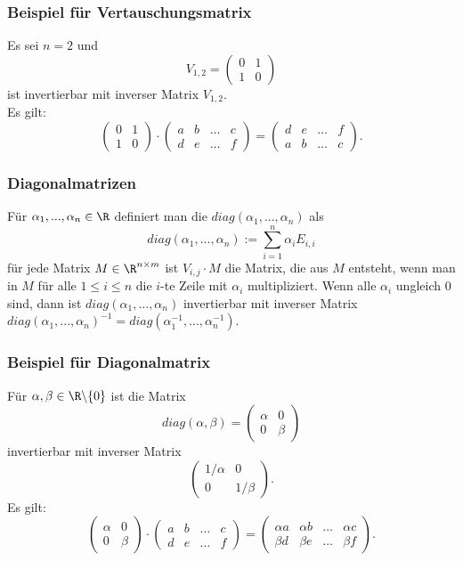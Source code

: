 \begin{frame}\frametitle{Beispiel für Vertauschungsmatrix}

	Es sei $n=2$ und 
	$$ 
		V_{1,2} =
		\begin{pmatrix}
			0 & 1\\
			1 & 0
		\end{pmatrix}
	$$
	ist invertierbar mit inverser Matrix $V_{1,2}$.\\
\pause \vfill
	Es gilt:
	$$
		\begin{pmatrix}
			0 & 1\\
			1 & 0
		\end{pmatrix} 
		\cdot
		\begin{pmatrix}
			a & b & \ldots & c\\
			d & e  & \ldots & f
		\end{pmatrix}
		=
		\begin{pmatrix}
			d & e  & \ldots & f\\
			a & b & \ldots & c
		\end{pmatrix}.
	$$
	
\end{frame}
%
\begin{frame}\frametitle{Diagonalmatrizen}
Für $\alpha_1,...,\alpha_n \in \R$ definiert man die  $diag(\alpha_1,...,\alpha_n)$ als
$$
diag(\alpha_1,...,\alpha_n):= \sum_{i=1}^n \alpha_i E_{i,i}
$$
für jede Matrix $M \in \R^{n\times m}$ ist $V_{i,j}\cdot M$ die Matrix, die aus $M$ entsteht, wenn man in $M$ für alle $1\le i \le n$ die $i$-te Zeile mit $\alpha_i$ multipliziert.
\vfill
Wenn alle $\alpha_i$ ungleich $0$ sind, dann ist $diag(\alpha_1,...,\alpha_n)$ invertierbar mit inverser Matrix $diag(\alpha_1,...,\alpha_n)^{-1}=diag(\alpha_1^{-1},...,\alpha_n^{-1})$.
\end{frame}
%
\begin{frame}\frametitle{Beispiel für Diagonalmatrix}

	Für $\alpha, \beta \in \R\backslash\{0\}$ ist die Matrix
	$$ 
		diag(\alpha,\beta)=\begin{pmatrix}
			\alpha & 0\\
			0         & \beta
		\end{pmatrix}
	$$
	invertierbar mit inverser Matrix 
	$$ 
		\begin{pmatrix}
			1/\alpha & 0\\
			0         & 1/\beta
		\end{pmatrix}.
	$$
	\pause
	Es gilt:
	$$
		\begin{pmatrix}
			\alpha & 0\\
			0         & \beta
		\end{pmatrix}
		\cdot
		\begin{pmatrix}
			a & b & \ldots & c\\
			d & e  & \ldots & f
		\end{pmatrix}
		=
		\begin{pmatrix}
			\alpha a & \alpha b  & \ldots & \alpha c\\
			\beta d & \beta e & \ldots & \beta f
		\end{pmatrix}.
	$$
	
\end{frame}
%




